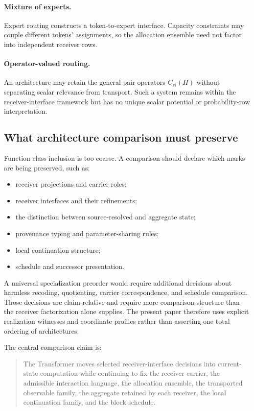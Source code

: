 \paragraph{Mixture of experts.}
Expert routing constructs a token-to-expert interface. Capacity constraints may couple different tokens' assignments, so the allocation ensemble need not factor into independent receiver rows.

\paragraph{Operator-valued routing.}
An architecture may retain the general pair operators $C_{ri}(H)$ without separating scalar relevance from transport. Such a system remains within the receiver-interface framework but has no unique scalar potential or probability-row interpretation.

\subsection{What architecture comparison must preserve}

Function-class inclusion is too coarse. A comparison should declare which marks are being preserved, such as:
\begin{itemize}
\item receiver projections and carrier roles;
\item receiver interfaces and their refinements;
\item the distinction between source-resolved and aggregate state;
\item provenance typing and parameter-sharing rules;
\item local continuation structure;
\item schedule and successor presentation.
\end{itemize}
A universal specialization preorder would require additional decisions about harmless recoding, quotienting, carrier correspondence, and schedule comparison. Those decisions are claim-relative and require more comparison structure than the receiver factorization alone supplies. The present paper therefore uses explicit realization witnesses and coordinate profiles rather than asserting one total ordering of architectures.

The central comparison claim is:
\begin{quote}
The Transformer moves selected receiver-interface decisions into current-state computation while continuing to fix the receiver carrier, the admissible interaction language, the allocation ensemble, the transported observable family, the aggregate retained by each receiver, the local continuation family, and the block schedule.
\end{quote}
